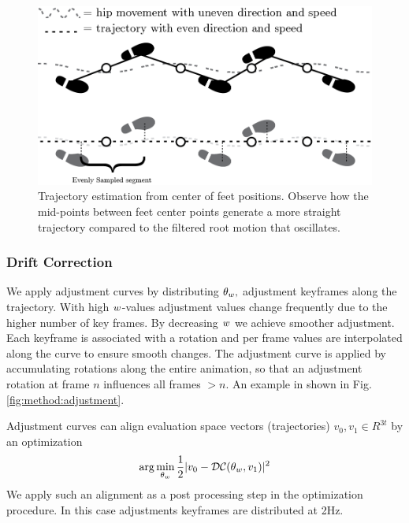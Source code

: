 \begin{figure}
    \centering
    \includegraphics[width=1\columnwidth]{img/trajectory.png}
    \caption{Trajectory estimation from center of feet positions. Observe how the mid-points between feet center points generate a more straight trajectory compared to the filtered root motion that oscillates.}
    \label{fig:method:trajectory}
\end{figure}

\subsubsection{\bf Drift Correction} 
We apply adjustment curves by distributing $\theta_{w},$ adjustment keyframes along the trajectory. With high ${w}$-values adjustment values change frequently due to the higher number of key frames. By decreasing ${w}$ we achieve smoother adjustment. Each keyframe is associated with a rotation and per frame values are interpolated along the curve to ensure smooth changes. The adjustment curve is applied by accumulating rotations along the entire animation, so that an adjustment rotation at frame $n$ influences all frames $>n$. An example in shown in Fig. \ref{fig:method:adjustment}. 

Adjustment curves can align evaluation space vectors (trajectories) $v_0,v_1\in R^{3t}$ by an optimization
\begin{subequations}
\begin{align}
    \arg\min_{\theta_{w}}{
        \frac{1}{2}|v_0-\mathcal{DC}(\theta_{w},v_1)|^2
    }
\end{align}
\end{subequations}
We apply such an alignment as a post processing step in the optimization procedure. In this case adjustments keyframes are distributed at 2Hz. 

